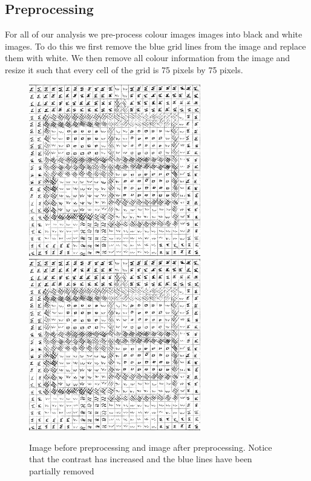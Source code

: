 \documentclass[preprint,3p,12pt]{elsarticle}
\begin{document}
\subsection{Preprocessing}
\label{process:preprocessing}

For all of our analysis we pre-process colour images images into black and white
images. To do this we first remove the blue grid lines from the image and
replace them with white. We then remove all colour information from the image
and resize it such that every cell of the grid is 75 pixels by 75 pixels.

\begin{figure}[h]
    \begin{center}
    \includegraphics[width=7.5cm, height=7.5cm]{preprocessing-initial}
    \includegraphics[width=7.5cm, height=7.5cm]{preprocessing-final}

    \caption{Image before preprocessing and image after preprocessing. Notice
        that the contrast has increased and the blue lines have been partially
        removed}

    \end{center}
\end{figure}
\end{document}
